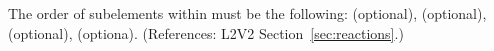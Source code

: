 The order of subelements within \Reaction must be the following:
 (optional),  (optional),
 (optional),  (optiona).
(References: L2V2 Section~\ref{sec:reactions}.)
